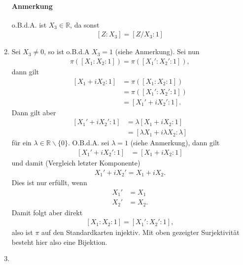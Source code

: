 \documentclass[11pt]{article}
\begin{document}
\begin{enumerate}
	\paragraph{Anmerkung} o.B.d.A. ist $ X_3 \in \mathbb{R} $, da sonst
	\begin{equation*}
	\begin{aligned}
	\left[Z :X_3\right] = \left[Z/X_3 : 1\right]
	\end{aligned}
	\end{equation*}
	\item Sei $ X_3 \neq 0 $, so ist o.B.d.A $ X_3 = 1 $ (siehe Anmerkung). Sei nun
	\begin{equation*}
	\begin{aligned}
	\pi\left(\left[X_1:X_2:1\right]\right) = \pi\left(\left[X_1':X_2':1\right]\right),
	\end{aligned}
	\end{equation*}
	dann gilt
	\begin{equation*}
	\begin{aligned}
	\left[X_1+iX_2 :1 \right] &= \pi\left(\left[X_1:X_2:1\right]\right)\\
	&= \pi\left(\left[X_1':X_2':1\right]\right)\\
	&= \left[X_1'+iX_2' :1 \right].
	\end{aligned}
	\end{equation*}
	Dann gilt aber
	\begin{equation*}
	\begin{aligned}
	\left[X_1'+iX_2' :1 \right] &= \lambda \left[X_1+iX_2 :1 \right]\\
	&= \left[\lambda X_1+i \lambda X_2 :\lambda \right]
	\end{aligned}
	\end{equation*}
	für ein $ \lambda \in \mathbb{R}\backslash\lbrace0\rbrace $. O.B.d.A. sei $ \lambda = 1 $ (siehe Anmerkung), dann gilt
	\begin{equation*}
	\begin{aligned}
		\left[X_1'+iX_2' :1 \right] &= \left[X_1+iX_2 :1 \right]
	\end{aligned}
	\end{equation*}
	und damit (Vergleich letzter Komponente)
	\begin{equation*}
	\begin{aligned}
	X_1'+iX_2' = X_1+iX_2.
	\end{aligned}
	\end{equation*}
	Dies ist nur erfüllt, wenn
	\begin{equation*}
	\begin{aligned}
	X_1' &= X_1\\
	X_2' &= X_2.
	\end{aligned}
	\end{equation*}
	Damit folgt aber direkt
	\begin{equation*}
	\begin{aligned}
	\left[X_1:X_2:1\right] = \left[X_1':X_2':1\right],
	\end{aligned}
	\end{equation*}
	also ist $ \pi $ auf den Standardkarten injektiv. Mit oben gezeigter Surjektivität besteht hier also eine Bijektion.
	\item 
\end{enumerate}
\end{document}
